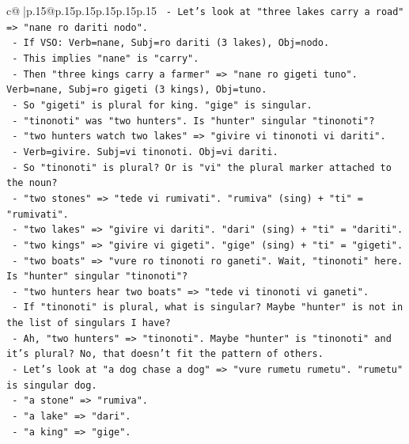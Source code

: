 \documentclass{article}
\begin{document}
{\begin{supertabular}{c@{$\;$}|p{.15\linewidth}@{}p{.15\linewidth}p{.15\linewidth}p{.15\linewidth}p{.15\linewidth}p{.15\linewidth}}
{{{\texttt{      {-} Let's look at "three lakes carry a road" => "nane ro dariti nodo".} \\
\texttt{        {-} If VSO: Verb=nane, Subj=ro dariti (3 lakes), Obj=nodo.} \\
\texttt{        {-} This implies "nane" is "carry".} \\
\texttt{        {-} Then "three kings carry a farmer" => "nane ro gigeti tuno". Verb=nane, Subj=ro gigeti (3 kings), Obj=tuno.} \\
\texttt{        {-} So "gigeti" is plural for king. "gige" is singular.} \\
\texttt{        {-} "tinonoti" was "two hunters". Is "hunter" singular "tinonoti"?} \\
\texttt{        {-} "two hunters watch two lakes" => "givire vi tinonoti vi dariti".} \\
\texttt{          {-} Verb=givire. Subj=vi tinonoti. Obj=vi dariti.} \\
\texttt{          {-} So "tinonoti" is plural? Or is "vi" the plural marker attached to the noun?} \\
\texttt{          {-} "two stones" => "tede vi rumivati". "rumiva" (sing) + "ti" = "rumivati".} \\
\texttt{          {-} "two lakes" => "givire vi dariti". "dari" (sing) + "ti" = "dariti".} \\
\texttt{          {-} "two kings" => "givire vi gigeti". "gige" (sing) + "ti" = "gigeti".} \\
\texttt{          {-} "two boats" => "vure ro tinonoti ro ganeti". Wait, "tinonoti" here. Is "hunter" singular "tinonoti"?} \\
\texttt{          {-} "two hunters hear two boats" => "tede vi tinonoti vi ganeti".} \\
\texttt{          {-} If "tinonoti" is plural, what is singular? Maybe "hunter" is not in the list of singulars I have?} \\
\texttt{          {-} Ah, "two hunters" => "tinonoti". Maybe "hunter" is "tinonoti" and it's plural? No, that doesn't fit the pattern of others.} \\
\texttt{          {-} Let's look at "a dog chase a dog" => "vure rumetu rumetu". "rumetu" is singular dog.} \\
\texttt{          {-} "a stone" => "rumiva".} \\
\texttt{          {-} "a lake" => "dari".} \\
\texttt{          {-} "a king" => "gige".} \\
}}}
\end{supertabular}}
\end{document}
